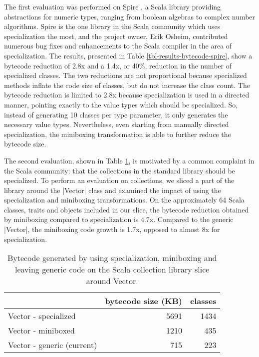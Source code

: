 The first evaluation was performed on Spire \cite{erik-spire}, a Scala library providing abstractions for numeric types, ranging from boolean algebras to complex number algorithms. Spire is the one library in the Scala community which uses specialization the most, and the project owner, Erik Osheim, contributed numerous bug fixes and enhancements to the Scala compiler in the area of specialization. The results, presented in Table \ref{tbl-results-bytecode-spire}, show a bytecode reduction of 2.8x and a 1.4x, or 40\%, reduction in the number of specialized classes. The two reductions are not proportional because specialized methods inflate the code size of classes, but do not increase the class count. The bytecode reduction is limited to 2.8x because specialization is used in a directed manner, pointing exactly to the value types which should be specialized. So, instead of generating 10 classes per type parameter, it only generates the necessary value types. Nevertheless, even starting from manually directed specialization, the miniboxing transformation is able to further reduce the bytecode size.    

The second evaluation, shown in Table \ref{tbl-results-bytecode-vector}, is motivated by a common complaint in the Scala community: that the collections in the standard library should be specialized. To perform an evaluation on collections, we sliced a part of the library around the |Vector| class and examined the impact of using the specialization and miniboxing transformations. On the approximately 64 Scala classes, traits and objects included in our slice, the bytecode reduction obtained by miniboxing compared to specialization is 4.7x. Compared to the generic |Vector|, the miniboxing code growth is 1.7x, opposed to almost 8x for specialization. 

\begin{table}[b!]
\centering
\small
\begin{tabular}{l|r|r}
                               &  bytecode size (KB) & classes \\\hline 
Vector - specialized           &                5691 &    1434 \\
\rowcolor{Gray}
Vector - miniboxed             &                1210 &     435 \\
Vector - generic (current)     &                 715 &     223 \\
\end{tabular}
\caption{Bytecode generated by using specialization, miniboxing and leaving generic code on the Scala collection library slice around Vector.}
\label{tbl-results-bytecode-vector}
\end{table}

